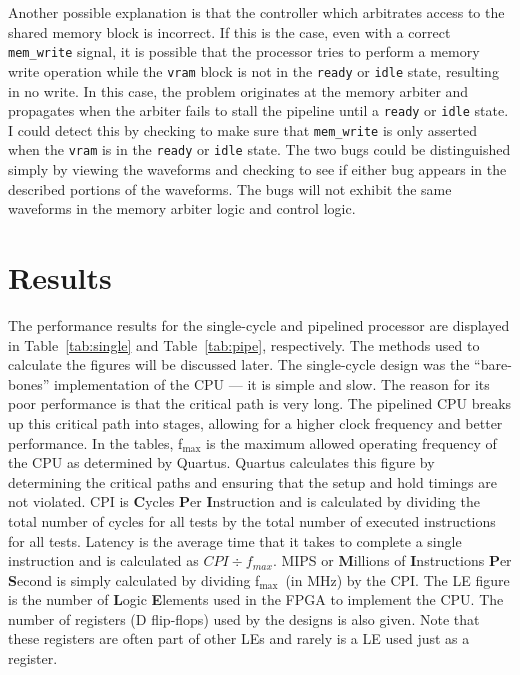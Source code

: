 \documentclass[12pt]{article}
\begin{document}
Another possible explanation is that the controller which arbitrates access to the shared memory block is incorrect. If this is the case, even with a correct \texttt{mem\_write} signal, it is possible that the processor tries to perform a memory write operation while the \texttt{vram} block is not in the \texttt{ready} or \texttt{idle} state, resulting in no write. In this case, the problem originates at the memory arbiter and propagates when the arbiter fails to stall the pipeline until a \texttt{ready} or \texttt{idle} state. I could detect this by checking to make sure that \texttt{mem\_write} is only asserted when the \texttt{vram} is in the \texttt{ready} or \texttt{idle} state. The two bugs could be distinguished simply by viewing the waveforms and checking to see if either bug appears in the described portions of the waveforms. The bugs will not exhibit the same waveforms in the memory arbiter logic and control logic.\\

\newpage
  \section{Results}
  
The performance results for the single-cycle and pipelined processor are displayed in Table~\ref{tab:single} and Table~\ref{tab:pipe}, respectively. The methods used to calculate the figures will be discussed later. The single-cycle design was the ``bare-bones'' implementation of the CPU --- it is simple and slow. The reason for its poor performance is that the critical path is very long. The pipelined CPU breaks up this critical path into stages, allowing for a higher clock frequency and better performance. In the tables, f$_{\textrm{max}}$ is the maximum allowed operating frequency of the CPU as determined by Quartus. Quartus calculates this figure by determining the critical paths and ensuring that the setup and hold timings are not violated. CPI is \textbf{C}ycles \textbf{P}er \textbf{I}nstruction and is calculated by dividing the total number of cycles for all tests by the total number of executed instructions for all tests. Latency is the average time that it takes to complete a single instruction and is calculated as $CPI \div f_{max}$. MIPS or \textbf{M}illions of \textbf{I}nstructions \textbf{P}er \textbf{S}econd is simply calculated by dividing f$_{\textrm{max}}$~(in MHz) by the CPI. The LE figure is the number of \textbf{L}ogic \textbf{E}lements used in the FPGA to implement the CPU. The number of registers (D flip-flops) used by the designs is also given. Note that these registers are often part of other LEs and rarely is a LE used just as a register.\\
\end{document}
